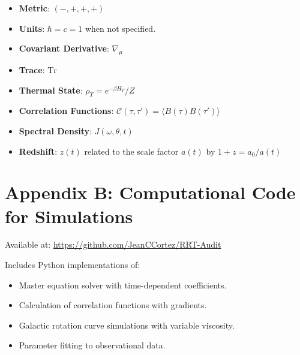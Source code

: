 \documentclass[10pt, a4paper]{article}
\newcommand{\Tr}{\text{Tr}}
\begin{document}
\begin{itemize}
\item \textbf{Metric}: $(-,+,+,+)$
\item \textbf{Units}: $\hbar=c=1$ when not specified.
\item \textbf{Covariant Derivative}: $\nabla_\mu$
\item \textbf{Trace}: $\Tr$
\item \textbf{Thermal State}: $\rho_T = e^{-\beta H_T}/Z$
\item \textbf{Correlation Functions}: $\mathcal{C}(\tau, \tau') = \langle B(\tau)B(\tau') \rangle$
\item \textbf{Spectral Density}: $J(\omega, \theta, t)$
\item \textbf{Redshift}: $z(t)$ related to the scale factor $a(t)$ by $1+z = a_0/a(t)$
\end{itemize}

\section{Appendix B: Computational Code for Simulations}

Available at: \url{https://github.com/JeanCCortez/RRT-Audit}

Includes Python implementations of:
\begin{itemize}
\item Master equation solver with time-dependent coefficients.
\item Calculation of correlation functions with gradients.
\item Galactic rotation curve simulations with variable viscosity.
\item Parameter fitting to observational data.
\end{itemize}
\end{document}
